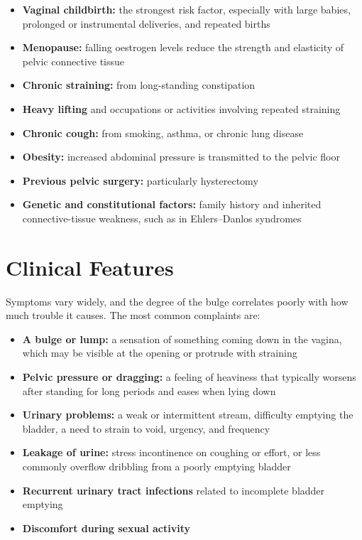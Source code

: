 \begin{itemize}
    \item \textbf{Vaginal childbirth:} the strongest risk factor, especially with large babies, prolonged or instrumental deliveries, and repeated births
    \item \textbf{Menopause:} falling oestrogen levels reduce the strength and elasticity of pelvic connective tissue
    \item \textbf{Chronic straining:} from long-standing constipation
    \item \textbf{Heavy lifting} and occupations or activities involving repeated straining
    \item \textbf{Chronic cough:} from smoking, asthma, or chronic lung disease
    \item \textbf{Obesity:} increased abdominal pressure is transmitted to the pelvic floor
    \item \textbf{Previous pelvic surgery:} particularly hysterectomy
    \item \textbf{Genetic and constitutional factors:} family history and inherited connective-tissue weakness, such as in Ehlers--Danlos syndromes
\end{itemize}

\section*{Clinical Features}
Symptoms vary widely, and the degree of the bulge correlates poorly with how much trouble it causes. The most common complaints are:

\begin{itemize}
    \item \textbf{A bulge or lump:} a sensation of something coming down in the vagina, which may be visible at the opening or protrude with straining
    \item \textbf{Pelvic pressure or dragging:} a feeling of heaviness that typically worsens after standing for long periods and eases when lying down
    \item \textbf{Urinary problems:} a weak or intermittent stream, difficulty emptying the bladder, a need to strain to void, urgency, and frequency
    \item \textbf{Leakage of urine:} stress incontinence on coughing or effort, or less commonly overflow dribbling from a poorly emptying bladder
    \item \textbf{Recurrent urinary tract infections} related to incomplete bladder emptying
    \item \textbf{Discomfort during sexual activity}
\end{itemize}

